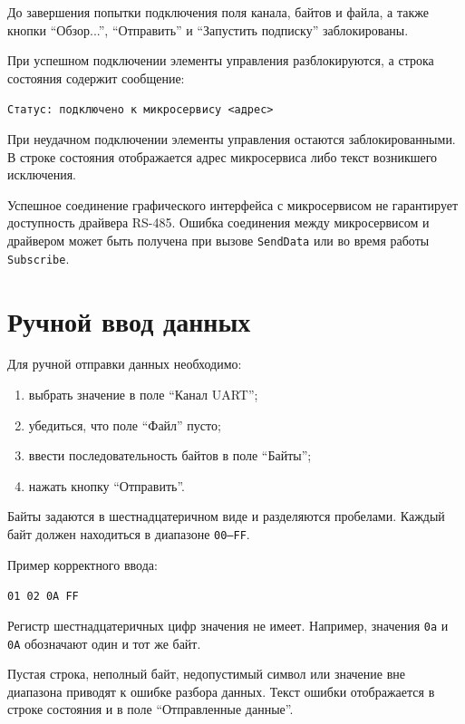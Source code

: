 До завершения попытки подключения поля канала, байтов и файла, а также кнопки
``Обзор...'', ``Отправить'' и ``Запустить подписку'' заблокированы.

При успешном подключении элементы управления разблокируются, а строка
состояния содержит сообщение:

\begin{center}
	\texttt{Статус: подключено к микросервису <адрес>}
\end{center}

При неудачном подключении элементы управления остаются заблокированными. В
строке состояния отображается адрес микросервиса либо текст возникшего
исключения.

Успешное соединение графического интерфейса с микросервисом не гарантирует
доступность драйвера RS-485. Ошибка соединения между микросервисом и драйвером
может быть получена при вызове \texttt{SendData} или во время работы
\texttt{Subscribe}.

\section{Ручной ввод данных}

Для ручной отправки данных необходимо:

\begin{enumerate}
	\item выбрать значение в поле ``Канал UART'';
	\item убедиться, что поле ``Файл'' пусто;
	\item ввести последовательность байтов в поле ``Байты'';
	\item нажать кнопку ``Отправить''.
\end{enumerate}

Байты задаются в шестнадцатеричном виде и разделяются пробелами. Каждый байт
должен находиться в диапазоне \texttt{00--FF}.

Пример корректного ввода:

\begin{center}
	\texttt{01 02 0A FF}
\end{center}

Регистр шестнадцатеричных цифр значения не имеет. Например, значения
\texttt{0a} и \texttt{0A} обозначают один и тот же байт.

Пустая строка, неполный байт, недопустимый символ или значение вне диапазона
приводят к ошибке разбора данных. Текст ошибки отображается в строке состояния
и в поле ``Отправленные данные''.

